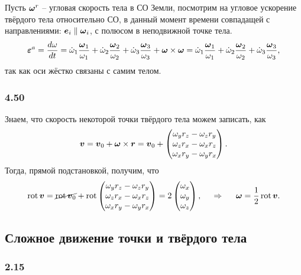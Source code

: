 Пусть $\mbox{\boldmath $\omega$}^r$ -- угловая скорость тела в СО Земли, посмотрим на угловое ускорение твёрдого тела относительно СО, в данный момент времени совпадащей с направлениями: $\mbox{\boldmath $e$}_i \parallel \mbox{\boldmath $\omega$}_i$, с полюсом в неподвижной точке тела.
$$
    \mbox{\boldmath $\varepsilon$}^a = \frac{d \omega}{d t} = 
    \dot{\omega}_1 \frac{\mbox{\boldmath $\omega$}_1}{\omega_1} +
    \dot{\omega}_2 \frac{\mbox{\boldmath $\omega$}_2}{\omega_2} +
    \dot{\omega}_3 \frac{\mbox{\boldmath $\omega$}_3}{\omega_3} + \mbox{\boldmath $\omega$} \times \mbox{\boldmath $\omega$} = 
    \dot{\omega}_1 \frac{\mbox{\boldmath $\omega$}_1}{\omega_1} +
    \dot{\omega}_2 \frac{\mbox{\boldmath $\omega$}_2}{\omega_2} +
    \dot{\omega}_3 \frac{\mbox{\boldmath $\omega$}_3}{\omega_3},
$$
так как оси жёстко связаны с самим телом.


\subsubsection*{4.50}

Знаем, что скорость некоторой точки твёрдого тела можем записать, как
$$
    \mbox{\boldmath $v$} = \mbox{\boldmath $v$}_0 + \mbox{\boldmath $\omega$}\times \mbox{\boldmath $r$} = \mbox{\boldmath $v$}_0 + \begin{pmatrix}
        \omega_y r_z - \omega_z r_y \\
        \omega_z r_x - \omega_x r_z \\
        \omega_x r_y - \omega_y r_x
    \end{pmatrix}.
$$
Тогда, прямой подстановкой, получим, что
$$
    \mathop{\mathrm{rot}}\nolimits \mbox{\boldmath $v$} = \cancel{\mathop{\mathrm{rot}}\nolimits \mbox{\boldmath $v$}_0} +
    \mathop{\mathrm{rot}}\nolimits \begin{pmatrix}
        \omega_y r_z - \omega_z r_y \\
        \omega_z r_x - \omega_x r_z \\
        \omega_x r_y - \omega_y r_x
    \end{pmatrix} =
    2 \begin{pmatrix}
        \omega_x \\ \omega_y \\ \omega_z
    \end{pmatrix},
    \hspace{0.5cm} \Rightarrow \hspace{0.5cm} 
    \mbox{\boldmath $\omega$} = \frac{1}{2} \mathop{\mathrm{rot}}\nolimits \mbox{\boldmath $v$} .
$$

\subsection{Сложное движение точки и твёрдого тела}

\subsubsection*{2.15}

